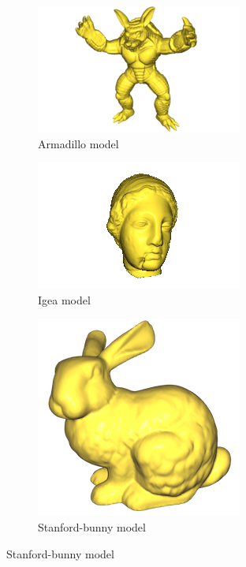 \documentclass[11pt,a4paper]{article}
\begin{document}
	\begin{figure}[ht]
	\begin{center}
		\begin{subfigure}{.3\textwidth}
			\centering
			\includegraphics[width=.8\linewidth]{armadillo.png}  
			\caption{Armadillo model}
			\label{fig:sub-first}
		\end{subfigure}
		\begin{subfigure}{.3\textwidth}
			\centering
			\includegraphics[width=.8\linewidth]{igea.png}  
			\caption{Igea model}
			\label{fig:sub-second}
		\end{subfigure}
		\begin{subfigure}{.3\textwidth}
			\centering
			\includegraphics[width=.8\linewidth]{stanford-bunny.png}  
			\caption{Stanford-bunny model}
			\label{fig:sub-third}
		\end{subfigure}
		

\end{center}
\end{figure}
\end{document}
